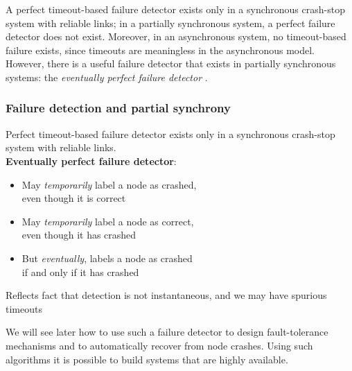 A perfect timeout-based failure detector exists only in a synchronous crash-stop system with reliable links; in a partially synchronous system, a perfect failure detector does not exist.
Moreover, in an asynchronous system, no timeout-based failure exists, since timeouts are meaningless in the asynchronous model.
However, there is a useful failure detector that exists in partially synchronous systems: the \emph{eventually perfect failure detector} \citep{Chandra:1996}.

\begin{frame}
    \label{s:eventual-detector}
    \frametitle{Failure detection and partial synchrony}
    Perfect timeout-based failure detector exists only in a synchronous crash-stop system with reliable links.\\[1em]
    \textbf{Eventually perfect failure detector}:
    \begin{itemize}
        \item May \emph{temporarily} label a node as crashed,\\ even though it is correct
        \item May \emph{temporarily} label a node as correct,\\ even though it has crashed
        \item But \emph{eventually}, labels a node as crashed\\ if and only if it has crashed\\[1em]
    \end{itemize}
    Reflects fact that detection is not instantaneous, and we may have spurious timeouts
\end{frame}
\label{l:eventual-detector}

We will see later how to use such a failure detector to design fault-tolerance mechanisms and to automatically recover from node crashes.
Using such algorithms it is possible to build systems that are highly available.

